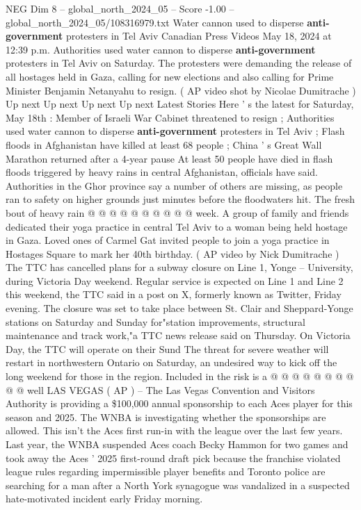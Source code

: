 \begin{textsample}{NEG Dim 8 – global\_north\_2024\_05 – Score -1.00 – global\_north\_2024\_05/108316979.txt}  \label{ex:f8_neg_277}
Water cannon used to disperse \textbf{anti-government} protesters in Tel Aviv Canadian Press Videos May 18, 2024 at 12:39 p.m.
Authorities used water cannon to disperse \textbf{anti-government} protesters in Tel Aviv on Saturday.
The protesters were demanding the release of all hostages held in Gaza, calling for new elections and also calling for Prime Minister Benjamin Netanyahu to resign. ( AP video shot by Nicolae Dumitrache ) Up next Up next Up next Up next Latest Stories Here ' s the latest for Saturday, May 18th : Member of Israeli War Cabinet threatened to resign ; Authorities used water cannon to disperse \textbf{anti-government} protesters in Tel Aviv ; Flash floods in Afghanistan have killed at least 68 people ; China ' s Great Wall Marathon returned after a 4-year pause At least 50 people have died in flash floods triggered by heavy rains in central Afghanistan, officials have said.
Authorities in the Ghor province say a number of others are missing, as people ran to safety on higher grounds just minutes before the floodwaters hit.
The fresh bout of heavy rain @ @ @ @ @ @ @ @ @ @ week.
A group of family and friends dedicated their yoga practice in central Tel Aviv to a woman being held hostage in Gaza.
Loved ones of Carmel Gat invited people to join a yoga practice in Hostages Square to mark her 40th birthday. ( AP video by Nick Dumitrache ) The TTC has cancelled plans for a subway closure on Line 1, Yonge -- University, during Victoria Day weekend.
Regular service is expected on Line 1 and Line 2 this weekend, the TTC said in a post on X, formerly known as Twitter, Friday evening.
The closure was set to take place between St.
Clair and Sheppard-Yonge stations on Saturday and Sunday for"station improvements, structural maintenance and track work,"a TTC news release said on Thursday.
On Victoria Day, the TTC will operate on their Sund The threat for severe weather will restart in northwestern Ontario on Saturday, an undesired way to kick off the long weekend for those in the region.
Included in the risk is a @ @ @ @ @ @ @ @ @ @ well LAS VEGAS ( AP ) -- The Las Vegas Convention and Visitors Authority is providing a \$100,000 annual sponsorship to each Aces player for this season and 2025.
The WNBA is investigating whether the sponsorships are allowed.
This isn't the Aces first run-in with the league over the last few years.
Last year, the WNBA suspended Aces coach Becky Hammon for two games and took away the Aces ' 2025 first-round draft pick because the franchise violated league rules regarding impermissible player benefits and Toronto police are searching for a man after a North York synagogue was vandalized in a suspected hate-motivated incident early Friday morning.

\end{textsample}
